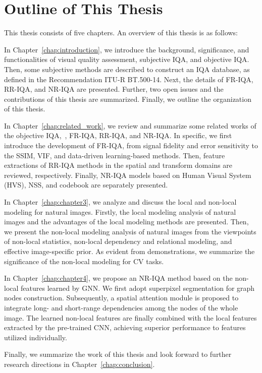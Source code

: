 \section{Outline of This Thesis}
This thesis consists of five chapters. An overview of this thesis is as follows:

In Chapter~\ref{chap:introduction}, we introduce the background, significance, and functionalities of visual quality assessment, subjective IQA, and objective IQA. Then, some subjective methods are described to construct an IQA database, as defined in the Recommendation ITU-R BT.500-14. Next, the details of FR-IQA, RR-IQA, and NR-IQA are presented. Further, two open issues and the contributions of this thesis are summarized. Finally, we outline the organization of this thesis.

In Chapter~\ref{chap:related_work}, we review and summarize some related works of the objective IQA,~\ie, FR-IQA, RR-IQA, and NR-IQA. In specific, we first introduce the development of FR-IQA, from signal fidelity and error sensitivity to the SSIM, VIF, and data-driven learning-based methods. Then, feature extractions of RR-IQA methods in the spatial and transform domains are reviewed, respectively. Finally, NR-IQA models based on Human Visual System (HVS), NSS, and codebook are separately presented.

In Chapter~\ref{chap:chapter3}, we analyze and discuss the local and non-local modeling for natural images. Firstly, the local modeling analysis of natural images and the advantages of the local modeling methods are presented. Then, we present the non-local modeling analysis of natural images from the viewpoints of non-local statistics, non-local dependency and relational modeling, and effective image-specific prior. As evident from demonstrations, we summarize the significance of the non-local modeling for CV tasks.

In Chapter~\ref{chap:chapter4}, we propose an NR-IQA method based on the non-local features learned by GNN. We first adopt superpixel segmentation for graph nodes construction. Subsequently, a spatial attention module is proposed to integrate long- and short-range dependencies among the nodes of the whole image. The learned non-local features are finally combined with the local features extracted by the pre-trained CNN, achieving superior performance to features utilized individually.

Finally, we summarize the work of this thesis and look forward to further research directions in Chapter~\ref{chap:conclusion}.
